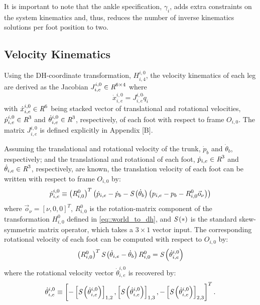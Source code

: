 			It is important to note that the ankle specification,  $\gamma_{i}$, adds extra constraints on the system kinematics and, thus, reduces the number of inverse kinematics solutions per foot position to two.




		\subsection{Velocity Kinematics}

			Using the DH-coordinate transformation, ${H}^{i,0}_{i,4}$, the velocity kinematics of each \Ith leg are derived as the Jacobian $J^{i,0}_{i,e} \in\emph{R}^{6\times4}$ where 
	\begin{equation}
		\dot{x}^{i,0}_{i,e} = J^{i,0}_{i,e}  \dot{q}_{i}
		\label{eq::leg_jacobian}
	\end{equation}
with $\dot{x}^{i,0}_{i,e} \in\emph{R}^{6}$ being stacked vector of translational and rotational velocities, $\dot{p}_{i,e}^{i,0} \in\emph{R}^{3}$ and $\dot{\theta}_{i,e}^{i,0}\in\emph{R}^{3}$, respectively, of each \Ith foot with respect to frame $O_{i,0}$. The matrix $J^{i,0}_{i,e}$ is defined explicitly in Appendix [B].

			Assuming the translational and rotational velocity of the trunk, $\dot{p}_{b}$ and $\dot{\theta}_{b}$, respectively; and the translational and rotational of each \Ith foot, $\dot{p}_{i,e} \in\emph{R}^{3}$ and $\dot{\theta}_{i,e} \in\emph{R}^{3}$, respectively, are known, the translation velocity of each \Ith foot can be written with respect to frame $O_{i,0}$ by:
				\begin{equation}
					\dot{p}_{i,e}^{i,0} \equiv \left(R^{0}_{i,0}\right)^{T} \left( \dot{p}_{i,e} - \dot{p}_{b} - \emph{S}\left( \dot{\theta}_{b} \right) \left( {p}_{i,e} - {p}_{b} - R^{0}_{i,0} \vec{o}_{\nu} \right) \right)
				\end{equation}
			where $\vec{o}_{\nu} = [\nu,0,0]^{T}$, $R^{0}_{i,0}$ is the rotation-matrix component of the transformation $H^{0}_{i,0}$ defined in \ref{eq::world_to_dh}, and $\emph{S}\left(*\right)$ is the standard skew-symmetric matrix operator, which takes a $3\times1$ vector input. The corresponding rotational velocity of each \Ith foot  can be computed with respect to $O_{i,0}$ by:
				\begin{equation}
					\left( R^{0}_{i,0} \right)^{T} \emph{S}\left( \dot{\theta}_{i,e} - \dot{\theta}_{b} \right) R^{0}_{i,0}  = \emph{S}\left( \dot{\theta}^{i,0}_{i,e} \right)
				\end{equation}
			where the rotational velocity vector $\dot{\theta}^{i,0}_{i,e}$ is recovered by:
				\begin{equation}
					\dot{\theta}^{i,0}_{i,e} \equiv \left[ 
						-\left[\emph{S}\left( \dot{\theta}^{i,0}_{i,e} \right)\right]_{1,2},
						 \left[\emph{S}\left( \dot{\theta}^{i,0}_{i,e} \right)\right]_{1,3},
						-\left[\emph{S}\left( \dot{\theta}^{i,0}_{i,e} \right)\right]_{2,3}
					\right]^{T}.
				\end{equation}

